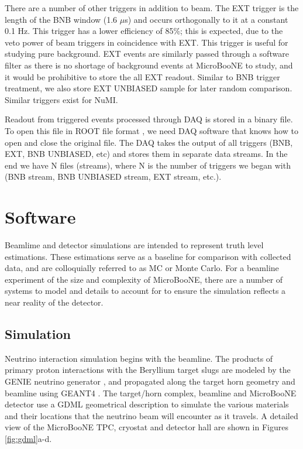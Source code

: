 \documentclass[12pt]{article}
\begin{document}
\par There are a number of other triggers in addition to beam. The EXT trigger is the length of the BNB window (1.6 $\mu$s) and occurs orthogonally to it at a constant 0.1 Hz. This trigger has a lower efficiency of 85\%; this is expected, due to the veto power of beam triggers in coincidence with EXT.  This trigger is useful for studying pure background. EXT events are similarly passed through a software filter as there is no shortage of background events at MicroBooNE to study, and it would be prohibitive to store the all EXT readout. Similar to BNB trigger treatment, we also store EXT UNBIASED sample for later random comparison. Similar triggers exist for NuMI.
\par Readout from triggered events processed through DAQ is stored in a binary file. To open this file in ROOT file format \cite{bib:root}, we need DAQ software that knows how to open and close the original file.  The DAQ takes the output of all triggers (BNB, EXT, BNB UNBIASED, etc) and stores them in separate data streams. In the end we have N files (streams), where N is the number of triggers we began with (BNB stream, BNB UNBIASED stream, EXT stream, etc.). 

\clearpage

\newpage
\section{Software} \label{sec:software}
Beamlime and detector simulations are intended to represent truth level estimations. These estimations serve as a baseline for comparison with collected data, and are colloquially referred to as MC or Monte Carlo.  For a beamline experiment of the size and complexity of MicroBooNE, there are a number of systems to model and details to account for to ensure the simulation reflects a near reality of the detector. 

\subsection{Simulation}
Neutrino interaction simulation begins with the beamline.  The products of primary proton interactions with the Beryllium target slugs are modeled by the GENIE neutrino generator \cite{bib:genie}, and propagated along the target horn geometry and beamline using GEANT4 \cite{bib:geant4}.  The target/horn complex, beamline and MicroBooNE detector use a GDML geometrical description \cite{bib:gdml} to simulate the various materials and their locations that the neutrino beam will encounter as it travels. A detailed view of the MicroBooNE TPC, cryostat and detector hall are shown in Figures \ref{fig:gdml}a-d.
\par 
\end{document}
